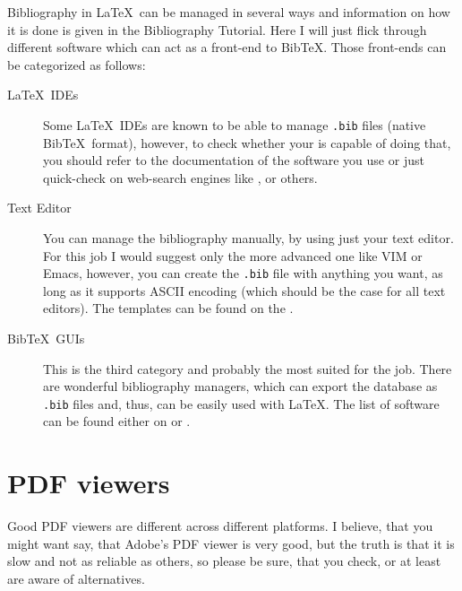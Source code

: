 Bibliography in \LaTeX\ can be managed in several ways and information on how it
is done is given in the Bibliography Tutorial. Here I will just flick through
different software which can act as a front-end to Bib\TeX{}. Those front-ends
can be categorized as follows:
\begin{description}
    \item[\LaTeX\ IDEs]
        Some \LaTeX\ IDEs are known to be able to manage \verb|.bib| files
        (native Bib\TeX\ format), however, to check whether your is capable of
        doing that, you should refer to the documentation of the software you
        use or just quick-check on web-search engines like
        ,
         or
        others.
    \item[Text Editor]
        You can manage the bibliography manually, by using just your text
        editor. For this job I would suggest only the more advanced one like VIM
        or Emacs, however, you can create the \verb|.bib| file with anything you
        want, as long as it supports ASCII encoding (which should be the case
        for all text editors). The templates can be found on the 
        .
    \item[Bib\TeX\ GUIs]
        This is the third category and probably the most suited for the job.
        There are wonderful bibliography managers, which can export the database
        as \verb|.bib| files and, thus, can be easily used with \LaTeX{}. The
        list of software can be found either on 
        or
        .
\end{description}

\section{PDF viewers}

Good PDF viewers are different across different platforms. I believe, that you
might want say, that Adobe's PDF viewer is very good, but the truth is that it
is slow and not as reliable as others, so please be sure, that you check, or at
least are aware of alternatives.


